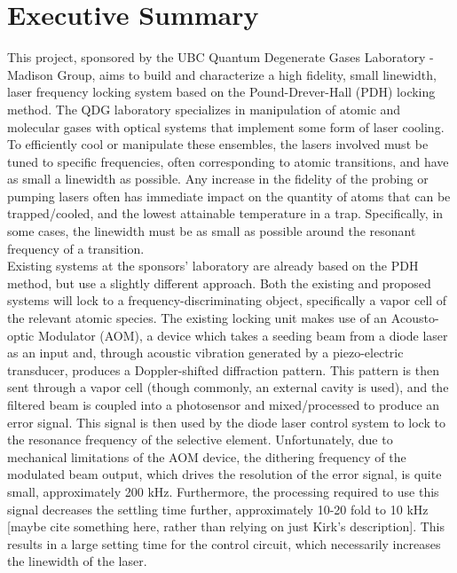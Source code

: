 \newpage
\section*{Executive Summary}

This project, sponsored by the UBC Quantum Degenerate Gases
Laboratory - Madison Group, aims to build and characterize a high
fidelity, small linewidth, laser frequency locking system based on the
Pound-Drever-Hall (PDH) locking method. The QDG laboratory 
specializes in manipulation of atomic and molecular gases with
optical systems that implement some form of laser cooling. To 
efficiently cool or manipulate these ensembles, the lasers involved
must be tuned to specific frequencies, often corresponding to atomic
transitions, and have as small a linewidth as possible. Any increase 
in the fidelity of the probing or pumping lasers often has immediate
impact on the quantity of atoms that can be trapped/cooled, and the 
lowest attainable temperature in a trap. Specifically, in some cases, 
the linewidth must be as small as possible around the resonant frequency 
of a transition. \\

\noindent Existing systems at the sponsors' laboratory are already based 
on the PDH method, but use a slightly different approach. Both the 
existing and proposed systems will lock to a frequency-discriminating 
object, specifically a vapor cell of the relevant atomic species. The
existing locking unit makes use of an Acousto-optic Modulator (AOM), a 
device which takes a seeding beam from a diode laser as an input and, 
through acoustic vibration generated by a piezo-electric transducer, 
produces a Doppler-shifted diffraction pattern. This pattern is then 
sent through a vapor cell (though commonly, an external cavity is used), 
and the filtered beam is coupled into a photosensor and mixed/processed 
to produce an error signal. This signal is then used by the diode laser 
control system to lock to the resonance frequency of the selective 
element. Unfortunately, due to mechanical limitations of the AOM device, 
the dithering frequency of the modulated beam output, which drives the 
resolution of the error signal, is quite small, approximately 200 kHz. 
Furthermore, the processing required to use this signal decreases the 
settling time further, approximately 10-20 fold to 10 kHz [maybe cite 
something here, rather than relying on just Kirk's description]. This 
results in a large setting time for the control circuit, which 
necessarily increases the linewidth of the laser.  \\

